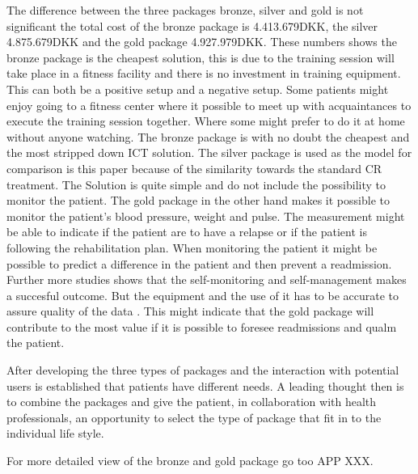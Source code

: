 The difference between the three packages bronze, silver and gold is not significant the total cost of the bronze package is 4.413.679DKK, the silver 4.875.679DKK and the gold package 4.927.979DKK. These numbers shows the bronze package is the cheapest solution, this is due to the training session will take place in a fitness facility and there is no investment in training equipment. This can both be a positive setup and a negative setup. Some patients might enjoy going to a fitness center where it possible to meet up with acquaintances to execute the training session together. Where some might prefer to do it at home without anyone watching. The bronze package is with no doubt the cheapest and the most stripped down ICT solution. The silver package is used as the model for comparison is this paper because of the similarity towards the standard CR treatment. The Solution is quite simple and do not include the possibility to monitor the patient. 
The gold package in the other hand makes it possible to monitor the patient's blood pressure, weight and pulse.  The measurement might be able to indicate if the patient are to have a relapse or if the patient is following the rehabilitation plan. When monitoring the patient it might be possible to predict a difference in the patient and then prevent a readmission. Further more studies shows that the self-monitoring and self-management makes a succesful outcome. But the equipment and the use of it has to be accurate to assure quality of the data \cite{considerations, NationalBoardofHealth}.  
This might indicate that the gold package will contribute to the most value if it is possible to foresee readmissions and qualm the patient.

After developing the three types of packages and the interaction with potential users is established that patients have different needs. A leading thought then is to combine the packages and give the patient, in collaboration with health professionals, an opportunity to select the type of package that fit in to the individual life style.  

For more detailed view of the bronze and gold package go too APP XXX. 


 






